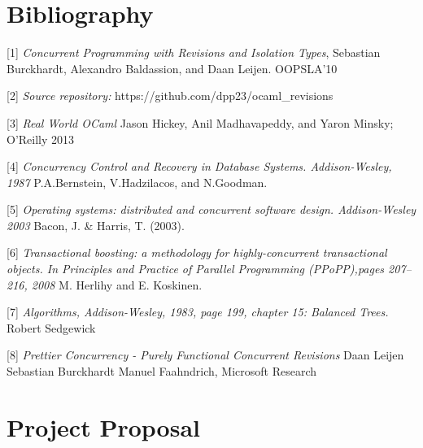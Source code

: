 \documentclass[12pt,twoside,notitlepage]{report}
\begin{document}
\chapter{Bibliography}
\begin{description}
\item{[1]} \emph{Concurrent Programming with Revisions and Isolation Types}, Sebastian Burckhardt, Alexandro Baldassion, and Daan Leijen. OOPSLA'10
\item{[2]} \emph{Source repository:} https://github.com/dpp23/ocaml\_revisions
\item{[3]} \emph{Real World OCaml} Jason Hickey, Anil Madhavapeddy, and Yaron Minsky; O'Reilly 2013
\item{[4]} \emph{Concurrency Control and Recovery in Database Systems. Addison-Wesley, 1987} P.A.Bernstein, V.Hadzilacos, and N.Goodman.


\item{[5]} \emph{Operating systems: distributed and concurrent software design. Addison-Wesley 2003} Bacon, J. \& Harris, T. (2003). 
\item{[6]} \emph{Transactional boosting: a
methodology for highly-concurrent transactional objects. In
Principles and Practice of Parallel Programming (PPoPP),pages 207–216, 2008} M. Herlihy and E. Koskinen. 

\item{[7]} \emph{Algorithms, Addison-Wesley, 1983, page 199, chapter 15: Balanced Trees.} Robert Sedgewick

\item{[8]} \emph{Prettier Concurrency - Purely Functional Concurrent Revisions} Daan Leijen Sebastian Burckhardt Manuel Faahndrich, Microsoft Research
\end{description}

\appendix


\chapter{Project Proposal}

%
\end{document}
